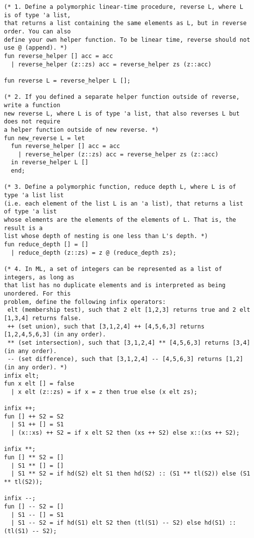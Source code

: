 \documentclass[10pt]{article}
\begin{document}
\begin{verbatim}
(* 1. Define a polymorphic linear-time procedure, reverse L, where L is of type 'a list, 
that returns a list containing the same elements as L, but in reverse order. You can also 
define your own helper function. To be linear time, reverse should not use @ (append). *)
fun reverse_helper [] acc = acc
  | reverse_helper (z::zs) acc = reverse_helper zs (z::acc)

fun reverse L = reverse_helper L [];

(* 2. If you defined a separate helper function outside of reverse, write a function 
new reverse L, where L is of type 'a list, that also reverses L but does not require 
a helper function outside of new reverse. *)
fun new_reverse L = let
  fun reverse_helper [] acc = acc
    | reverse_helper (z::zs) acc = reverse_helper zs (z::acc)
  in reverse_helper L []
  end;

(* 3. Define a polymorphic function, reduce depth L, where L is of type 'a list list 
(i.e. each element of the list L is an 'a list), that returns a list of type 'a list 
whose elements are the elements of the elements of L. That is, the result is a 
list whose depth of nesting is one less than L's depth. *)
fun reduce_depth [] = []
  | reduce_depth (z::zs) = z @ (reduce_depth zs);
  
(* 4. In ML, a set of integers can be represented as a list of integers, as long as 
that list has no duplicate elements and is interpreted as being unordered. For this 
problem, define the following infix operators:
 elt (membership test), such that 2 elt [1,2,3] returns true and 2 elt [1,3,4] returns false.
 ++ (set union), such that [3,1,2,4] ++ [4,5,6,3] returns [1,2,4,5,6,3] (in any order).
 ** (set intersection), such that [3,1,2,4] ** [4,5,6,3] returns [3,4] (in any order).
 -- (set difference), such that [3,1,2,4] -- [4,5,6,3] returns [1,2] (in any order). *)
infix elt;
fun x elt [] = false
  | x elt (z::zs) = if x = z then true else (x elt zs);

infix ++;
fun [] ++ S2 = S2
  | S1 ++ [] = S1
  | (x::xs) ++ S2 = if x elt S2 then (xs ++ S2) else x::(xs ++ S2);

infix **;
fun [] ** S2 = []
  | S1 ** [] = []
  | S1 ** S2 = if hd(S2) elt S1 then hd(S2) :: (S1 ** tl(S2)) else (S1 ** tl(S2));

infix --;
fun [] -- S2 = []
  | S1 -- [] = S1
  | S1 -- S2 = if hd(S1) elt S2 then (tl(S1) -- S2) else hd(S1) :: (tl(S1) -- S2);


\end{verbatim}
\end{document}
